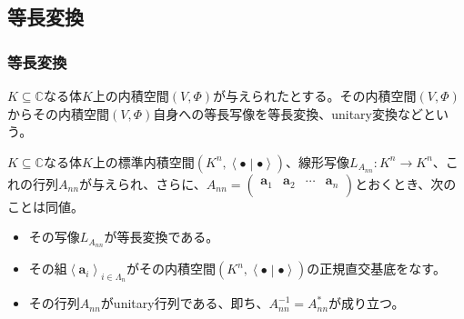 \documentclass[dvipdfmx]{jsarticle}
\begin{document}
\subsection{等長変換}%
\subsubsection{等長変換}%
\begin{dfn}
$K \subseteq \mathbb{C}$なる体$K$上の内積空間$(V,\varPhi)$が与えられたとする。その内積空間$(V,\varPhi)$からその内積空間$(V,\varPhi)$自身への等長写像を等長変換、unitary変換などという。
\end{dfn}
\begin{thm}\label{2.3.8.1}
$K \subseteq \mathbb{C}$なる体$K$上の標準内積空間$\left( K^{n},\left\langle \bullet \middle| \bullet \right\rangle \right)$、線形写像$L_{A_{nn}}:K^{n} \rightarrow K^{n}$、これの行列$A_{nn}$が与えられ、さらに、$A_{nn} = \begin{pmatrix}
\mathbf{a}_{1} & \mathbf{a}_{2} & \cdots & \mathbf{a}_{n} \\
\end{pmatrix}$とおくとき、次のことは同値。
\begin{itemize}
\item
  その写像$L_{A_{nn}}$が等長変換である。
\item
  その組$\left\langle \mathbf{a}_{i} \right\rangle_{i \in \varLambda_{n}}$がその内積空間$\left( K^{n},\left\langle \bullet \middle| \bullet \right\rangle \right)$の正規直交基底をなす。
\item
  その行列$A_{nn}$がunitary行列である、即ち、$A_{nn}^{- 1} = A_{nn}^{*}$が成り立つ。
\end{itemize}
\end{thm}
\end{document}
